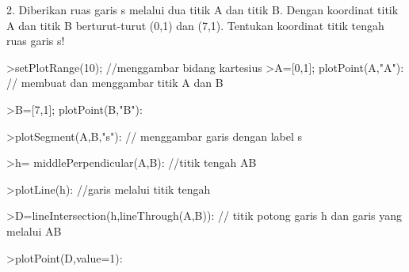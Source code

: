 \documentclass[a4paper,10pt]{article}
\begin{document}
\begin{eulernotebook}
\begin{eulercomment}
\begin{eulercomment}
\begin{eulerprompt}
\end{eulerprompt}
\begin{eulercomment}
2. Diberikan ruas garis s melalui dua titik A dan titik B. Dengan
koordinat titik A dan titik B berturut-turut (0,1) dan (7,1). Tentukan
koordinat titik tengah ruas garis s!
\end{eulercomment}
\begin{eulerprompt}
>setPlotRange(10); //menggambar bidang kartesius
>A=[0,1]; plotPoint(A,"A"): // membuat dan menggambar titik A dan B
\end{eulerprompt}
\begin{eulerprompt}
>B=[7,1]; plotPoint(B,"B"):
\end{eulerprompt}
\begin{eulerprompt}
>plotSegment(A,B,"s"): // menggambar garis dengan label s
\end{eulerprompt}
\begin{eulerprompt}
>h= middlePerpendicular(A,B): //titik tengah AB
\end{eulerprompt}
\begin{eulerprompt}
>plotLine(h): //garis melalui titik tengah 
\end{eulerprompt}
\begin{eulerprompt}
>D=lineIntersection(h,lineThrough(A,B)): // titik potong garis h dan garis yang melalui AB
\end{eulerprompt}
\begin{eulerprompt}
>plotPoint(D,value=1):
\end{eulerprompt}
\begin{eulercomment}

\end{eulercomment}
\end{eulercomment}
\end{eulercomment}
\end{eulernotebook}
\end{document}
